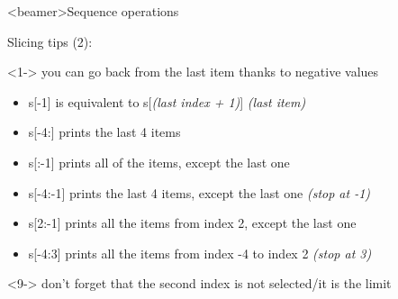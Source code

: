 \begin{frame}<beamer>{Sequence operations}

  \begin{center}

  Slicing tips (2):

  \bigskip

  \begin{onlyenv}<1->
    you can go back from the last item thanks to negative values \\
  \end{onlyenv}

  \bigskip

  \begin{itemize}
    \item<2-> s[-1] is equivalent to s[{\footnotesize\textit{(last index + 1)}}] \textit{(last item)} \\
    \item<3-> s[-4:] prints the last 4 items \\
    \item<5-> s[:-1] prints all of the items, except the last one \\
    \item<6-> s[-4:-1] prints the last 4 items, except the last one \textit{(stop at -1)} \\
    \item<7-> s[2:-1] prints all the items from index 2, except the last one \\
    \item<8-> s[-4:3] prints all the items from index -4 to index 2 \textit{(stop at 3)} \\
  \end{itemize}

  \bigskip

  \begin{onlyenv}<9->
    don't forget that the second index is not selected/it is the limit \\
  \end{onlyenv}

  \end{center}

\end{frame}





